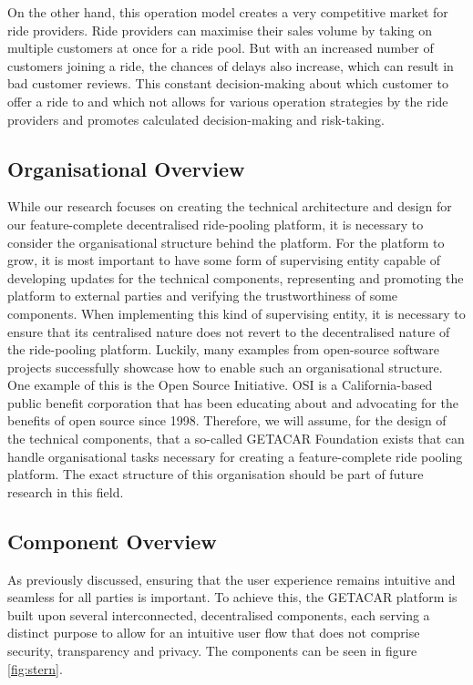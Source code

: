 On the other hand, this operation model creates a very competitive market for ride providers. Ride providers can maximise their sales volume by taking on multiple customers at once for a ride pool. But with an increased number of customers joining a ride, the chances of delays also increase, which can result in bad customer reviews. This constant decision-making about which customer to offer a ride to and which not allows for various operation strategies by the ride providers and promotes calculated decision-making and risk-taking. 

\subsection{Organisational Overview}\label{subsec:OrganisationalOverview}
While our research focuses on creating the technical architecture and design for our feature-complete decentralised ride-pooling platform, it is necessary to consider the organisational structure behind the platform. For the platform to grow, it is most important to have some form of supervising entity capable of developing updates for the technical components, representing and promoting the platform to external parties and verifying the trustworthiness of some components. When implementing this kind of supervising entity, it is necessary to ensure that its centralised nature does not revert to the decentralised nature of the ride-pooling platform. Luckily, many examples from open-source software projects successfully showcase how to enable such an organisational structure. One example of  this is the Open Source Initiative. OSI is a California-based public benefit corporation that has been educating about and advocating for the benefits of open source since 1998. Therefore, we will assume, for the design of the technical components, that a so-called GETACAR Foundation exists that can handle organisational tasks necessary for creating a feature-complete ride pooling platform. The exact structure of this organisation should be part of future research in this field.

\subsection{Component Overview}\label{subsec:ComponentOverview}
As previously discussed, ensuring that the user experience remains intuitive and seamless for all parties is important. To achieve this, the GETACAR platform is built upon several interconnected, decentralised components, each serving a distinct purpose to allow for an intuitive user flow that does not comprise security, transparency and privacy. The components can be seen in figure \ref{fig:stern}.

